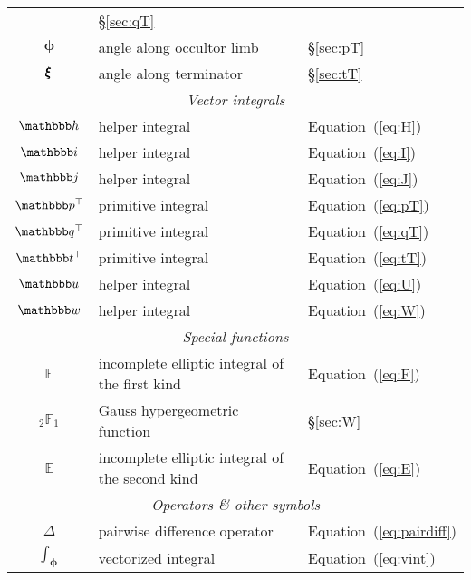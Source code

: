 \begin{center}
\begin{longtable}{cll}
         & \S\ref{sec:qT}
        \\
        $\pmb{\phi}$
         & angle along occultor limb
         & \S\ref{sec:pT}
        \\
        $\pmb{\xi}$
         & angle along terminator
         & \S\ref{sec:tT}
        \\
        \midrule
        \multicolumn{3}{c}{\emph{Vector integrals}}
        \\
        \midrule
        $\viH$
         & helper integral
         & Equation~(\ref{eq:H})
        \\
        $\viI$
         & helper integral
         & Equation~(\ref{eq:I})
        \\
        $\viJ$
         & helper integral
         & Equation~(\ref{eq:J})
        \\
        $\pT$
         & primitive integral
         & Equation~(\ref{eq:pT})
        \\
        $\qT$
         & primitive integral
         & Equation~(\ref{eq:qT})
        \\
        $\tT$
         & primitive integral
         & Equation~(\ref{eq:tT})
        \\
        $\viU$
         & helper integral
         & Equation~(\ref{eq:U})
        \\
        $\viW$
         & helper integral
         & Equation~(\ref{eq:W})
        \\
        \midrule
        \multicolumn{3}{c}{\emph{Special functions}}
        \\
        \midrule
        $\mathbb{F}$
         & incomplete elliptic integral of the first kind
         & Equation~(\ref{eq:F})
        \\
        ${_2}\mathbb{F}_1$
         & Gauss hypergeometric function
         & \S\ref{sec:W}
        \\
        $\mathbb{E}$
         & incomplete elliptic integral of the second kind
         & Equation~(\ref{eq:E})
        \\
        \midrule
        \multicolumn{3}{c}{\emph{Operators \& other symbols}}
        \\
        \midrule
        $\Delta$
         & pairwise difference operator
         & Equation~(\ref{eq:pairdiff})
        \\
        $\int_{\pmb{\phi}}$
         & vectorized integral
         & Equation~(\ref{eq:vint})
        \\
    \end{longtable}
\end{center}